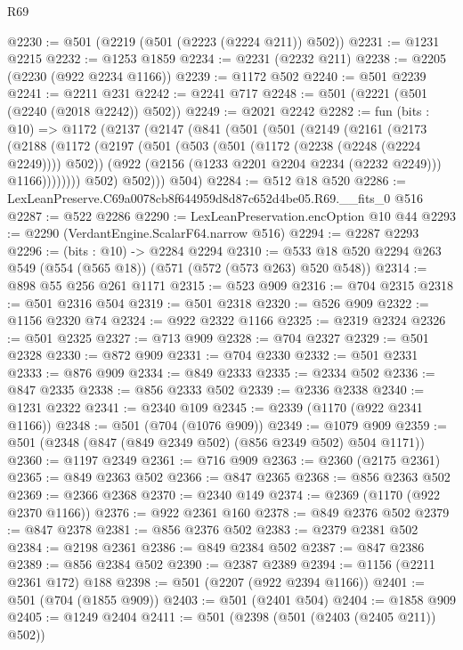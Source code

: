 \begin{lexlean}{R69}
\begin{coremodule}
@2230 := @501 (@2219 (@501 (@2223 (@2224 @211)) @502))
@2231 := @1231 @2215
@2232 := @1253 @1859
@2234 := @2231 (@2232 @211)
@2238 := @2205 (@2230 (@922 @2234 @1166))
@2239 := @1172 @502
@2240 := @501 @2239
@2241 := @2211 @231
@2242 := @2241 @717
@2248 := @501 (@2221 (@501 (@2240 (@2018 @2242)) @502))
@2249 := @2021 @2242
@2282 := fun (bits : @10) =>
  @1172
    (@2137
      (@2147
        (@841
          (@501
            (@501
              (@2149
                (@2161
                  (@2173
                    (@2188
                      (@1172
                        (@2197
                          (@501
                            (@503 (@501 (@1172 (@2238 (@2248 (@2224 @2249)))) @502))
                            (@922 (@2156 (@1233 @2201 @2204 @2234 (@2232 @2249))) @1166))))))))
              @502)
            @502)))
      @504)
@2284 := @512 @18 @520
@2286 := LexLeanPreserve.C69a0078cb8f644959d8d87c652d4be05.R69.__fits_0 @516
@2287 := @522 @2286
@2290 := LexLeanPreservation.encOption @10 @44
@2293 := @2290 (VerdantEngine.ScalarF64.narrow @516)
@2294 := @2287 @2293
@2296 := (bits : @10) -> @2284 @2294
@2310 := @533 @18 @520 @2294 @263 @549 (@554 (@565 @18)) (@571 (@572 (@573 @263) @520 @548))
@2314 := @898 @55 @256 @261 @1171
@2315 := @523 @909
@2316 := @704 @2315
@2318 := @501 @2316 @504
@2319 := @501 @2318
@2320 := @526 @909
@2322 := @1156 @2320 @74
@2324 := @922 @2322 @1166
@2325 := @2319 @2324
@2326 := @501 @2325
@2327 := @713 @909
@2328 := @704 @2327
@2329 := @501 @2328
@2330 := @872 @909
@2331 := @704 @2330
@2332 := @501 @2331
@2333 := @876 @909
@2334 := @849 @2333
@2335 := @2334 @502
@2336 := @847 @2335
@2338 := @856 @2333 @502
@2339 := @2336 @2338
@2340 := @1231 @2322
@2341 := @2340 @109
@2345 := @2339 (@1170 (@922 @2341 @1166))
@2348 := @501 (@704 (@1076 @909))
@2349 := @1079 @909
@2359 := @501 (@2348 (@847 (@849 @2349 @502) (@856 @2349 @502) @504 @1171))
@2360 := @1197 @2349
@2361 := @716 @909
@2363 := @2360 (@2175 @2361)
@2365 := @849 @2363 @502
@2366 := @847 @2365
@2368 := @856 @2363 @502
@2369 := @2366 @2368
@2370 := @2340 @149
@2374 := @2369 (@1170 (@922 @2370 @1166))
@2376 := @922 @2361 @160
@2378 := @849 @2376 @502
@2379 := @847 @2378
@2381 := @856 @2376 @502
@2383 := @2379 @2381 @502
@2384 := @2198 @2361
@2386 := @849 @2384 @502
@2387 := @847 @2386
@2389 := @856 @2384 @502
@2390 := @2387 @2389
@2394 := @1156 (@2211 @2361 @172) @188
@2398 := @501 (@2207 (@922 @2394 @1166))
@2401 := @501 (@704 (@1855 @909))
@2403 := @501 (@2401 @504)
@2404 := @1858 @909
@2405 := @1249 @2404
@2411 := @501 (@2398 (@501 (@2403 (@2405 @211)) @502))

\end{coremodule}
\end{lexlean}
